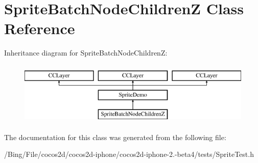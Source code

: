 \hypertarget{interface_sprite_batch_node_children_z}{\section{Sprite\-Batch\-Node\-Children\-Z Class Reference}
\label{interface_sprite_batch_node_children_z}
}
Inheritance diagram for Sprite\-Batch\-Node\-Children\-Z\-:\begin{figure}[H]
\begin{center}
\leavevmode
\includegraphics[height=3.000000cm]{interface_sprite_batch_node_children_z}
\end{center}
\end{figure}


The documentation for this class was generated from the following file\-:\begin{DoxyCompactItemize}
\item 
/\-Bing/\-File/cocos2d/cocos2d-\/iphone/cocos2d-\/iphone-\/2.-\/beta4/tests/Sprite\-Test.\-h\end{DoxyCompactItemize}
